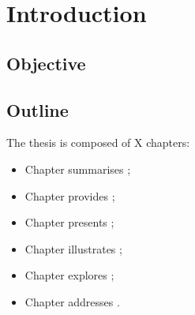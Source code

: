 \chapter{Introduction}
\label{chap:intro}



\lipsum[1]




\section{Objective}
\label{sec:objective}

\lipsum[1]




\section{Outline}
\label{sec:outline}


The thesis is composed of X chapters:
\begin{itemize}
	\item Chapter summarises ;
	
	\item Chapter provides ;
	
	\item Chapter presents ;
		
	\item Chapter illustrates ;

	\item Chapter explores ;	
	
	\item Chapter addresses .
\end{itemize}






